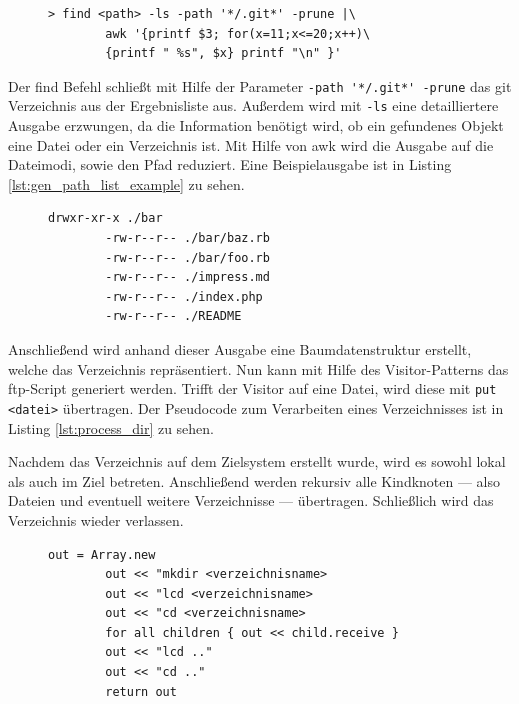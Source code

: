\begin{figure}
	\begin{lstlisting}[caption=Generiere Liste aller Pfade,label={lst:gen_path_list}]
	> find <path> -ls -path '*/.git*' -prune |\
		awk '{printf $3; for(x=11;x<=20;x++)\
		{printf " %s", $x} printf "\n" }'
	\end{lstlisting}
\end{figure}

Der \gls{find} Befehl schließt mit Hilfe der Parameter \lstinline!-path '*/.git*' -prune! das git Verzeichnis aus der Ergebnisliste aus. Außerdem wird mit \lstinline!-ls! eine detailliertere Ausgabe erzwungen, da die Information benötigt wird, ob ein gefundenes Objekt eine Datei oder ein Verzeichnis ist. Mit Hilfe von \gls{awk} wird die Ausgabe auf die Dateimodi, sowie den Pfad reduziert. Eine Beispielausgabe ist in Listing \ref{lst:gen_path_list_example} zu sehen.

\begin{figure}
	\begin{lstlisting}[caption=Beispielausgabe für gefundene Pfade,label={lst:gen_path_list_example}]
		drwxr-xr-x ./bar
		-rw-r--r-- ./bar/baz.rb
		-rw-r--r-- ./bar/foo.rb
		-rw-r--r-- ./impress.md
		-rw-r--r-- ./index.php
		-rw-r--r-- ./README
	\end{lstlisting}
\end{figure}
     
Anschließend wird anhand dieser Ausgabe eine Baumdatenstruktur erstellt, welche das Verzeichnis repräsentiert. Nun kann mit Hilfe des Visitor-Patterns\cite{designpatterns} das \gls{ftp}-Script generiert werden. Trifft der Visitor auf eine Datei, wird diese mit \lstinline!put <datei>! übertragen. Der Pseudocode zum Verarbeiten eines Verzeichnisses ist in Listing \ref{lst:process_dir} zu sehen.

Nachdem das Verzeichnis auf dem Zielsystem erstellt wurde, wird es sowohl lokal als auch im Ziel betreten. Anschließend werden rekursiv alle Kindknoten — also Dateien und eventuell weitere Verzeichnisse — übertragen. Schließlich wird das Verzeichnis wieder verlassen.

\begin{figure}
	\begin{lstlisting}[caption=Verarbeitung eines Verzeichnisses,label={lst:process_dir}]
		out = Array.new
		out << "mkdir <verzeichnisname>
		out << "lcd <verzeichnisname>
		out << "cd <verzeichnisname>
		for all children { out << child.receive }
		out << "lcd .."
		out << "cd .."
		return out
	\end{lstlisting}
\end{figure}

